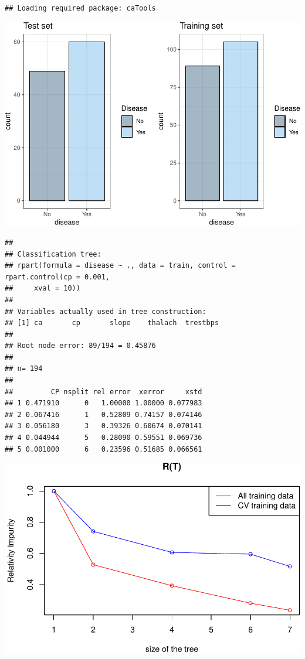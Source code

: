 \documentclass[]{article}
\begin{document}
\begin{verbatim}
## Loading required package: caTools
\end{verbatim}

\includegraphics{project_report_files/figure-latex/unnamed-chunk-30-1.pdf}

\begin{verbatim}
## 
## Classification tree:
## rpart(formula = disease ~ ., data = train, control = rpart.control(cp = 0.001, 
##     xval = 10))
## 
## Variables actually used in tree construction:
## [1] ca       cp       slope    thalach  trestbps
## 
## Root node error: 89/194 = 0.45876
## 
## n= 194 
## 
##         CP nsplit rel error  xerror     xstd
## 1 0.471910      0   1.00000 1.00000 0.077983
## 2 0.067416      1   0.52809 0.74157 0.074146
## 3 0.056180      3   0.39326 0.60674 0.070141
## 4 0.044944      5   0.28090 0.59551 0.069736
## 5 0.001000      6   0.23596 0.51685 0.066561
\end{verbatim}

\includegraphics{project_report_files/figure-latex/unnamed-chunk-31-1.pdf}
\end{document}
